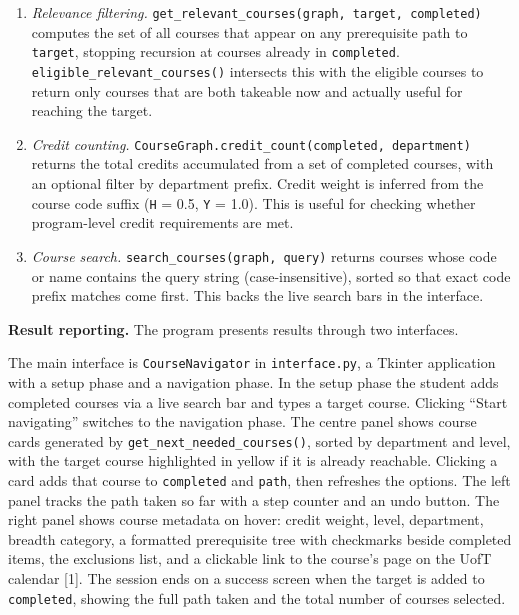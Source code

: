 \documentclass[11pt]{article}
\begin{document}
\begin{enumerate}
    A \verb|visited| set is threaded through all recursive calls to prevent infinite loops
    when the prerequisite graph has cycles.

    \item \textit{Relevance filtering.}
    \verb|get_relevant_courses(graph, target, completed)| computes the set of all courses
    that appear on any prerequisite path to \verb|target|, stopping recursion at courses
    already in \verb|completed|. \verb|eligible_relevant_courses()| intersects this with the
    eligible courses to return only courses that are both takeable now and actually useful for
    reaching the target.

    \item \textit{Credit counting.}
    \verb|CourseGraph.credit_count(completed, department)| returns the total credits
    accumulated from a set of completed courses, with an optional filter by department prefix.
    Credit weight is inferred from the course code suffix (\verb|H| = 0.5, \verb|Y| = 1.0).
    This is useful for checking whether program-level credit requirements are met.

    \item \textit{Course search.}
    \verb|search_courses(graph, query)| returns courses whose code or name contains the query
    string (case-insensitive), sorted so that exact code prefix matches come first. This backs
    the live search bars in the interface.

\end{enumerate}

\textbf{Result reporting.} The program presents results through two interfaces.

The main interface is \verb|CourseNavigator| in \verb|interface.py|, a Tkinter application
with a setup phase and a navigation phase. In the setup phase the student adds completed
courses via a live search bar and types a target course. Clicking ``Start navigating''
switches to the navigation phase. The centre panel shows course cards generated by
\verb|get_next_needed_courses()|, sorted by department and level, with the target course
highlighted in yellow if it is already reachable. Clicking a card adds that course to
\verb|completed| and \verb|path|, then refreshes the options. The left panel tracks the path
taken so far with a step counter and an undo button. The right panel shows course metadata
on hover: credit weight, level, department, breadth category, a formatted prerequisite
tree with checkmarks beside completed items, the exclusions list, and a clickable link to the
course's page on the UofT calendar [1]. The session ends on a success screen when the target
is added to \verb|completed|, showing the full path taken and the total number of courses
selected.
\end{document}
